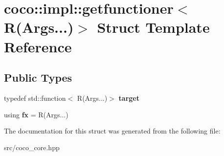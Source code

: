 \hypertarget{structcoco_1_1impl_1_1getfunctioner_3_01_r_07_args_8_8_8_08_4}{}\section{coco\+:\+:impl\+:\+:getfunctioner$<$ R(Args...)$>$ Struct Template Reference}
\label{structcoco_1_1impl_1_1getfunctioner_3_01_r_07_args_8_8_8_08_4}
\subsection*{Public Types}
\begin{DoxyCompactItemize}
\item 
\hypertarget{structcoco_1_1impl_1_1getfunctioner_3_01_r_07_args_8_8_8_08_4_a7572e5f95c6cb289a8ff1ebbd5aaa8a7}{}typedef std\+::function$<$ R(Args...)$>$ {\bfseries target}\label{structcoco_1_1impl_1_1getfunctioner_3_01_r_07_args_8_8_8_08_4_a7572e5f95c6cb289a8ff1ebbd5aaa8a7}

\item 
\hypertarget{structcoco_1_1impl_1_1getfunctioner_3_01_r_07_args_8_8_8_08_4_af21388293087ebe0cdffbee090673e81}{}using {\bfseries fx} = R(Args...)\label{structcoco_1_1impl_1_1getfunctioner_3_01_r_07_args_8_8_8_08_4_af21388293087ebe0cdffbee090673e81}

\end{DoxyCompactItemize}


The documentation for this struct was generated from the following file\+:\begin{DoxyCompactItemize}
\item 
src/coco\+\_\+core.\+hpp\end{DoxyCompactItemize}
